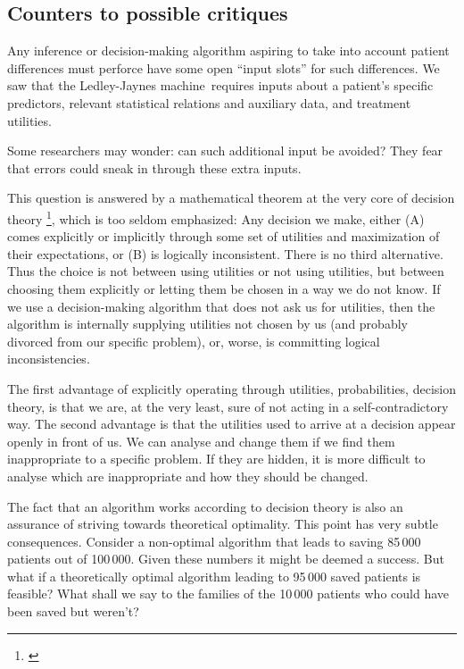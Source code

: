 \documentclass[utf8]{FrontiersinHarvard} %
\renewcommand*{\|}[1][]{\nonscript\:#1\vert\nonscript\:\mathopen{}}
\newcommand*{\ljm}{Ledley-Jaynes machine}
\begin{document}
\subsection{Counters to possible critiques}
\label{sec:critics}

Any inference or decision-making algorithm aspiring to take into account patient differences must perforce have some open \enquote{input slots} for such differences. We saw that the \ljm\ requires inputs about a patient's specific predictors, relevant statistical relations and auxiliary data, and treatment utilities.

Some researchers may wonder: can such additional input be avoided? They fear that errors could sneak in through these extra inputs.

This question is answered by a mathematical theorem at the very core of decision theory \footnote{\citet{savage1954_r1972,luceetal1957,raiffaetal1961_r2000,atkinsonetal1964,ferguson1967,lindley1971_r1988,kreps1988,bernardoetal1994_r2000,prattetal1995_r1996,lindley2006_r2014,pettigrew2011_r2019}}, which is too seldom emphasized: Any decision we make, either (A) comes explicitly or implicitly through some set of utilities and maximization of their expectations, or (B) is logically inconsistent. There is no third alternative. Thus the choice is not between using utilities or not using utilities, but between choosing them explicitly or letting them be chosen in a way we do not know. If we use a decision-making algorithm that does not ask us for utilities, then the algorithm is internally supplying utilities not chosen by us (and probably divorced from our specific problem), or, worse, is committing logical inconsistencies.

The first advantage of explicitly operating through utilities, probabilities, decision theory, is that we are, at the very least, sure of not acting in a self-contradictory way. The second advantage is that the utilities used to arrive at a decision appear openly in front of us. We can analyse and change them if we find them inappropriate to a specific problem. If they are hidden, it is more difficult to analyse which are inappropriate and how they should be changed.

The fact that an algorithm works according to decision theory is also an assurance of striving towards theoretical optimality. This point has very subtle consequences. Consider a non-optimal algorithm that leads to saving 85\,000 patients out of 100\,000. Given these numbers it might be deemed a success. But what if a theoretically optimal algorithm leading to 95\,000 saved patients is feasible? What shall we say to the families of the 10\,000 patients who could have been saved but weren't?
\end{document}
